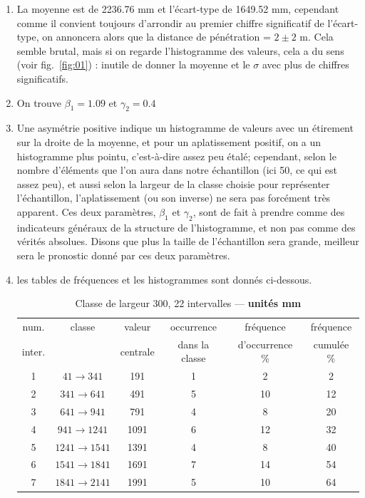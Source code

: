 \begin{enumerate}%
\item La moyenne est de 2236.76 mm et l'écart-type de 1649.52 mm, cependant comme il convient toujours d'arrondir au premier chiffre significatif de l'écart-type, on annoncera alors que la distance de pénétration = $2\pm 2$ m. Cela semble brutal, mais si on regarde l'histogramme des valeurs, cela a du sens (voir fig.~\ref{fig:01}) : inutile de donner la moyenne et le $\sigma$ avec plus de chiffres significatifs.
\item On trouve $\beta_1=1.09$ et $\gamma_2=0.4$
\item Une asymétrie positive indique un histogramme de valeurs avec un étirement sur la droite de la moyenne, et pour un aplatissement positif, on a un histogramme plus pointu, c'est-à-dire assez peu étalé; cependant, selon le nombre d'éléments que l'on aura dans notre échantillon (ici 50, ce qui est assez peu), et aussi selon la largeur de la classe choisie pour représenter l'échantillon, l'aplatissement (ou son inverse) ne sera pas forcément très apparent. Ces deux paramètres, $\beta_1$ et $\gamma_2$, sont de fait à prendre comme des indicateurs généraux de la structure de l'histogramme, et non pas comme des vérités absolues. Disons que plus la taille de l'échantillon sera grande, meilleur sera le pronostic donné par ces deux paramètres.
\item les tables de fréquences et les histogrammes sont donnés ci-dessous.
\begin{table}
\caption{Classe de largeur 300, 22 intervalles --- \textbf{unités mm}}
\begin{center}
\begin{tabular}{cccccc}
\hline
num. & classe & valeur & occurrence & fréquence & fréquence\\
inter. &  & centrale & dans la classe & d'occurrence \% & cumulée \%\\\hline
 1 & $  41 \rightarrow  341$ &  191 & 1 &  2 &   2\\
 2 & $ 341 \rightarrow  641$ &  491 & 5 & 10 &  12\\
 3 & $ 641 \rightarrow  941$ &  791 & 4 &  8 &  20\\
 4 & $ 941 \rightarrow 1241$ & 1091 & 6 & 12 &  32\\
 5 & $1241 \rightarrow 1541$ & 1391 & 4 &  8 &  40\\
 6 & $1541 \rightarrow 1841$ & 1691 & 7 & 14 &  54\\
 7 & $1841 \rightarrow 2141$ & 1991 & 5 & 10 &  64\\

\end{tabular}
\end{center}
\end{table}
\end{enumerate}
